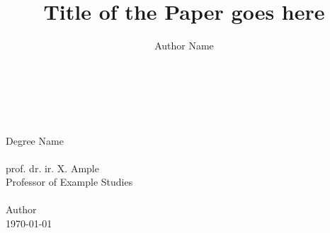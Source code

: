 \documentclass[a4paper,11pt,twoside]{article} %
\begin{document}
\pagestyle{body}


\title{
    \vspace{5cm}
        {\bf
        {\Huge Title of the Paper goes here\\}
        }
}
\date{}
\author{Author Name}

\maketitle
\thispagestyle{titlepage}


\newpage

\thispagestyle{titlepage}

\vspace*{4cm}

\begin{center}
    \\
    \\
    \vspace{1cm}{\bf Thesis/Dissertation}\\
    \vspace{0.5cm}Degree Name\\
    \vspace{1cm}{\bf Supervised by}\\
    \vspace{0.5cm}prof. dr. ir. X. Ample\\
    Professor of Example Studies\\
    \vspace{1cm}{\bf Written by}\\
    \vspace{0.5cm} Author\\
    \vspace{4cm}\today
    
\end{center}

\newpage

\setlength{\headheight}{32pt}








\end{document}
